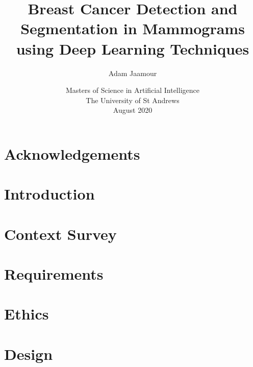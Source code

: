 \documentclass[11pt,openright,twoside,a4paper]{report}
\title{Breast Cancer Detection and Segmentation in Mammograms using Deep Learning Techniques}
\author{Adam Jaamour}
\date{Masters of Science in Artificial Intelligence\\The University of St Andrews\\August 2020}
\begin{document}
\setcounter{page}{0}

\maketitle
\newpage

\newpage

\abstract

\newpage

\setcounter{tocdepth}{3}
\tableofcontents
\newpage
\listoffigures
\newpage
\listoftables
\newpage

\chapter*{Acknowledgements}

\newpage


\setcounter{page}{1}

\chapter{Introduction}
\label{ch:chapter1}


\chapter{Context Survey}
\label{ch:chapter2}


\chapter{Requirements}
\label{ch:chapter3}


\chapter{Ethics}
\label{ch:chapter4}


\chapter{Design}
\label{ch:chapter5}

\end{document}
